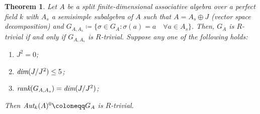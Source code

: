 \documentclass[12pt]{amsart}
\newtheorem{theorem}{Theorem}[section]
\theoremstyle{definition}
\numberwithin{equation}{section}
\begin{document}
\vspace{0.2in}
\begin{theorem}\label{Theorem 4.20}
Let $A$ be a split finite-dimensional associative algebra over a perfect field $k$ with $A_s$ a semisimple subalgebra of $A$ such that $A=A_s\oplus J$ (vector space decomposition) and $G_{A, A_s}\coloneq\{\sigma\in G_A: \sigma(a)=a \quad \forall a\in A_s\}$. Then, $G_A$ is $R$-trivial if and only if $G_{A,A_s}$ is $R$-trivial. Suppose any one of the following holds: 
\begin{enumerate}
    \item $J^2=0$;
    \vskip2mm
    \item $\emph{dim}(J/J^2)\leq 5$;
    \vskip2mm
    \item $\emph{rank}(G_{A,A_s})=\emph{dim}(J/J^2)$;
\end{enumerate}
\vskip2mm
 Then $\emph{\text{Aut}}_k(A)^{0}\coloneqq G_A$ is $R$-trivial.
\end{theorem}
\vskip1mm
\end{document}
